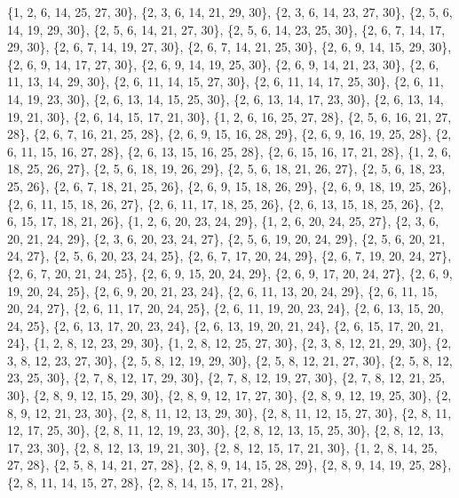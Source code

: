 \documentclass[11pt,a4paper]{article}
\begin{document}
{\{1, 2, 6, 14, 25, 27, 30\}, \{2, 3, 6, 14, 21, 29, 30\}, \{2, 3, 6, 14, 23, 27, 30\}, \{2, 5, 6, 14, 19, 29, 30\}, \{2, 5, 6, 14, 21, 27, 30\},
\{2, 5, 6, 14, 23, 25, 30\}, \{2, 6, 7, 14, 17, 29, 30\}, \{2, 6, 7, 14, 19, 27, 30\}, \{2, 6, 7, 14, 21, 25, 30\}, \{2, 6, 9, 14, 15, 29, 30\},
\{2, 6, 9, 14, 17, 27, 30\}, \{2, 6, 9, 14, 19, 25, 30\}, \{2, 6, 9, 14, 21, 23, 30\}, \{2, 6, 11, 13, 14, 29, 30\}, \{2, 6, 11, 14, 15, 27, 30\},
\{2, 6, 11, 14, 17, 25, 30\}, \{2, 6, 11, 14, 19, 23, 30\}, \{2, 6, 13, 14, 15, 25, 30\}, \{2, 6, 13, 14, 17, 23, 30\}, \{2, 6, 13, 14, 19, 21, 30\},
\{2, 6, 14, 15, 17, 21, 30\}, \{1, 2, 6, 16, 25, 27, 28\}, \{2, 5, 6, 16, 21, 27, 28\}, \{2, 6, 7, 16, 21, 25, 28\}, \{2, 6, 9, 15, 16, 28, 29\},
\{2, 6, 9, 16, 19, 25, 28\}, \{2, 6, 11, 15, 16, 27, 28\}, \{2, 6, 13, 15, 16, 25, 28\}, \{2, 6, 15, 16, 17, 21, 28\}, \{1, 2, 6, 18, 25, 26, 27\},
\{2, 5, 6, 18, 19, 26, 29\}, \{2, 5, 6, 18, 21, 26, 27\}, \{2, 5, 6, 18, 23, 25, 26\}, \{2, 6, 7, 18, 21, 25, 26\}, \{2, 6, 9, 15, 18, 26, 29\},
\{2, 6, 9, 18, 19, 25, 26\}, \{2, 6, 11, 15, 18, 26, 27\}, \{2, 6, 11, 17, 18, 25, 26\}, \{2, 6, 13, 15, 18, 25, 26\}, \{2, 6, 15, 17, 18, 21, 26\},
\{1, 2, 6, 20, 23, 24, 29\}, \{1, 2, 6, 20, 24, 25, 27\}, \{2, 3, 6, 20, 21, 24, 29\}, \{2, 3, 6, 20, 23, 24, 27\}, \{2, 5, 6, 19, 20, 24, 29\},
\{2, 5, 6, 20, 21, 24, 27\}, \{2, 5, 6, 20, 23, 24, 25\}, \{2, 6, 7, 17, 20, 24, 29\}, \{2, 6, 7, 19, 20, 24, 27\}, \{2, 6, 7, 20, 21, 24, 25\},
\{2, 6, 9, 15, 20, 24, 29\}, \{2, 6, 9, 17, 20, 24, 27\}, \{2, 6, 9, 19, 20, 24, 25\}, \{2, 6, 9, 20, 21, 23, 24\}, \{2, 6, 11, 13, 20, 24, 29\},
\{2, 6, 11, 15, 20, 24, 27\}, \{2, 6, 11, 17, 20, 24, 25\}, \{2, 6, 11, 19, 20, 23, 24\}, \{2, 6, 13, 15, 20, 24, 25\}, \{2, 6, 13, 17, 20, 23, 24\},
\{2, 6, 13, 19, 20, 21, 24\}, \{2, 6, 15, 17, 20, 21, 24\}, \{1, 2, 8, 12, 23, 29, 30\}, \{1, 2, 8, 12, 25, 27, 30\}, \{2, 3, 8, 12, 21, 29, 30\},
\{2, 3, 8, 12, 23, 27, 30\}, \{2, 5, 8, 12, 19, 29, 30\}, \{2, 5, 8, 12, 21, 27, 30\}, \{2, 5, 8, 12, 23, 25, 30\}, \{2, 7, 8, 12, 17, 29, 30\},
\{2, 7, 8, 12, 19, 27, 30\}, \{2, 7, 8, 12, 21, 25, 30\}, \{2, 8, 9, 12, 15, 29, 30\}, \{2, 8, 9, 12, 17, 27, 30\}, \{2, 8, 9, 12, 19, 25, 30\},
\{2, 8, 9, 12, 21, 23, 30\}, \{2, 8, 11, 12, 13, 29, 30\}, \{2, 8, 11, 12, 15, 27, 30\}, \{2, 8, 11, 12, 17, 25, 30\}, \{2, 8, 11, 12, 19, 23, 30\},
\{2, 8, 12, 13, 15, 25, 30\}, \{2, 8, 12, 13, 17, 23, 30\}, \{2, 8, 12, 13, 19, 21, 30\}, \{2, 8, 12, 15, 17, 21, 30\}, \{1, 2, 8, 14, 25, 27, 28\},
\{2, 5, 8, 14, 21, 27, 28\}, \{2, 8, 9, 14, 15, 28, 29\}, \{2, 8, 9, 14, 19, 25, 28\}, \{2, 8, 11, 14, 15, 27, 28\}, \{2, 8, 14, 15, 17, 21, 28\},
}
\end{document}
